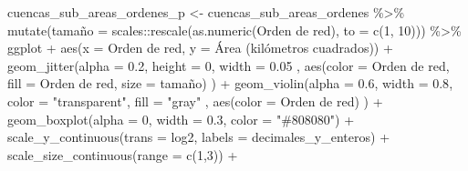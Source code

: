 \documentclass[spanish]{article}
\newenvironment{Shaded}{\begin{snugshade}}{\end{snugshade}}
\newcommand{\AttributeTok}[1]{\textcolor[rgb]{0.77,0.63,0.00}{#1}}
\newcommand{\DecValTok}[1]{\textcolor[rgb]{0.00,0.00,0.81}{#1}}
\newcommand{\FloatTok}[1]{\textcolor[rgb]{0.00,0.00,0.81}{#1}}
\newcommand{\FunctionTok}[1]{\textcolor[rgb]{0.00,0.00,0.00}{#1}}
\newcommand{\NormalTok}[1]{#1}
\newcommand{\OtherTok}[1]{\textcolor[rgb]{0.56,0.35,0.01}{#1}}
\newcommand{\SpecialCharTok}[1]{\textcolor[rgb]{0.00,0.00,0.00}{#1}}
\newcommand{\StringTok}[1]{\textcolor[rgb]{0.31,0.60,0.02}{#1}}
\begin{document}
\begin{Shaded}
\begin{Highlighting}[]
\NormalTok{cuencas\_sub\_areas\_ordenes\_p }\OtherTok{\textless{}{-}}\NormalTok{ cuencas\_sub\_areas\_ordenes }\SpecialCharTok{\%\textgreater{}\%}
  \FunctionTok{mutate}\NormalTok{(}\StringTok{\textasciigrave{}}\AttributeTok{tamaño}\StringTok{\textasciigrave{}} \OtherTok{=}\NormalTok{ scales}\SpecialCharTok{::}\FunctionTok{rescale}\NormalTok{(}\FunctionTok{as.numeric}\NormalTok{(}\StringTok{\textasciigrave{}}\AttributeTok{Orden de red}\StringTok{\textasciigrave{}}\NormalTok{), }\AttributeTok{to =} \FunctionTok{c}\NormalTok{(}\DecValTok{1}\NormalTok{, }\DecValTok{10}\NormalTok{))) }\SpecialCharTok{\%\textgreater{}\%} 
\NormalTok{  ggplot }\SpecialCharTok{+}
  \FunctionTok{aes}\NormalTok{(}\AttributeTok{x =} \StringTok{\textasciigrave{}}\AttributeTok{Orden de red}\StringTok{\textasciigrave{}}\NormalTok{, }\AttributeTok{y =} \StringTok{\textasciigrave{}}\AttributeTok{Área (kilómetros cuadrados)}\StringTok{\textasciigrave{}}\NormalTok{) }\SpecialCharTok{+}
  \FunctionTok{geom\_jitter}\NormalTok{(}\AttributeTok{alpha =} \FloatTok{0.2}\NormalTok{, }\AttributeTok{height =} \DecValTok{0}\NormalTok{, }\AttributeTok{width =} \FloatTok{0.05}
\NormalTok{              , }\FunctionTok{aes}\NormalTok{(}\AttributeTok{color =} \StringTok{\textasciigrave{}}\AttributeTok{Orden de red}\StringTok{\textasciigrave{}}\NormalTok{, }\AttributeTok{fill =} \StringTok{\textasciigrave{}}\AttributeTok{Orden de red}\StringTok{\textasciigrave{}}\NormalTok{, }\AttributeTok{size =} \StringTok{\textasciigrave{}}\AttributeTok{tamaño}\StringTok{\textasciigrave{}}\NormalTok{)}
\NormalTok{              ) }\SpecialCharTok{+}
  \FunctionTok{geom\_violin}\NormalTok{(}\AttributeTok{alpha =} \FloatTok{0.6}\NormalTok{, }\AttributeTok{width =} \FloatTok{0.8}\NormalTok{, }\AttributeTok{color =} \StringTok{"transparent"}\NormalTok{, }\AttributeTok{fill =} \StringTok{"gray"}
\NormalTok{              , }\FunctionTok{aes}\NormalTok{(}\AttributeTok{color =} \StringTok{\textasciigrave{}}\AttributeTok{Orden de red}\StringTok{\textasciigrave{}}\NormalTok{)}
\NormalTok{              ) }\SpecialCharTok{+}
  \FunctionTok{geom\_boxplot}\NormalTok{(}\AttributeTok{alpha =} \DecValTok{0}\NormalTok{, }\AttributeTok{width =} \FloatTok{0.3}\NormalTok{, }\AttributeTok{color =} \StringTok{"\#808080"}\NormalTok{) }\SpecialCharTok{+}
  \FunctionTok{scale\_y\_continuous}\NormalTok{(}\AttributeTok{trans =} \StringTok{\textquotesingle{}log2\textquotesingle{}}\NormalTok{, }\AttributeTok{labels =}\NormalTok{ decimales\_y\_enteros) }\SpecialCharTok{+}
  \FunctionTok{scale\_size\_continuous}\NormalTok{(}\AttributeTok{range =} \FunctionTok{c}\NormalTok{(}\DecValTok{1}\NormalTok{,}\DecValTok{3}\NormalTok{)) }\SpecialCharTok{+}

\end{Highlighting}
\end{Shaded}
\end{document}
